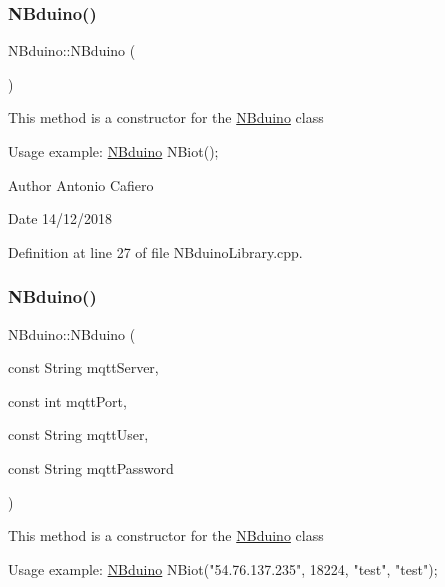 \subsubsection{\texorpdfstring{N\+Bduino()}{NBduino()}\hspace{0.1cm}{\footnotesize\ttfamily [1/3]}}
{\footnotesize\ttfamily N\+Bduino\+::\+N\+Bduino (\begin{DoxyParamCaption}{ }\end{DoxyParamCaption})}

This method is a constructor for the \mbox{\hyperlink{class_n_bduino}{N\+Bduino}} class 
\begin{DoxyCode}
Usage example:
    \mbox{\hyperlink{class_n_bduino}{NBduino}} NBiot();
\end{DoxyCode}
 \begin{DoxyAuthor}{Author}
Antonio Cafiero 
\end{DoxyAuthor}
\begin{DoxyDate}{Date}
14/12/2018 
\end{DoxyDate}


Definition at line 27 of file N\+Bduino\+Library.\+cpp.

\mbox{\label{class_n_bduino_af520a0691a464694c224aba7bd1b81f6}} 
\subsubsection{\texorpdfstring{N\+Bduino()}{NBduino()}\hspace{0.1cm}{\footnotesize\ttfamily [2/3]}}
{\footnotesize\ttfamily N\+Bduino\+::\+N\+Bduino (\begin{DoxyParamCaption}\item[{const String}]{mqtt\+Server,  }\item[{const int}]{mqtt\+Port,  }\item[{const String}]{mqtt\+User,  }\item[{const String}]{mqtt\+Password }\end{DoxyParamCaption})}

This method is a constructor for the \mbox{\hyperlink{class_n_bduino}{N\+Bduino}} class 
\begin{DoxyCode}
Usage example:
    \mbox{\hyperlink{class_n_bduino}{NBduino}} NBiot(\textcolor{stringliteral}{"54.76.137.235"}, 18224, \textcolor{stringliteral}{"test"}, \textcolor{stringliteral}{"test"});
\end{DoxyCode}
 
